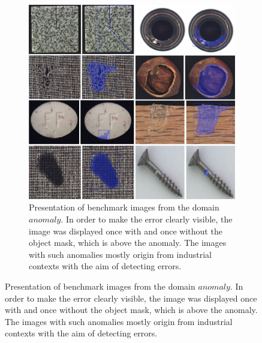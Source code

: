 \begin{figure} \ContinuedFloat
	\begin{subfigure}[t]{1.0\textwidth} 
		\centering
		\includegraphics[width=\textwidth]{figures/appendix/benchmark_dataset_anomaly_examples/anomaly_collage.png}
		\caption{
			Presentation of benchmark images from the domain $ anomaly $.
			In order to make the error clearly visible, the image was displayed once with and once without the object mask, which is above the anomaly.
			The images with such anomalies mostly origin from industrial contexts with the aim of detecting errors.			
		} \label{fig:appendix_domain_anomaly}
	\end{subfigure}
\end{figure}
